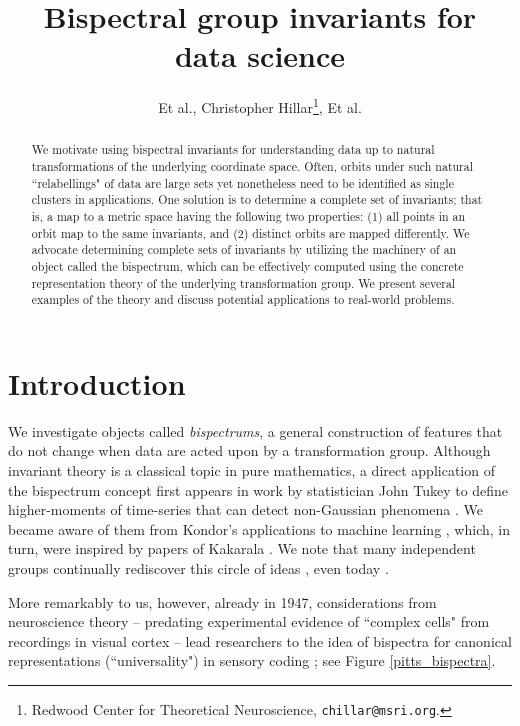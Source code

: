 \documentclass[letterpaper, 10pt]{article}
\theoremstyle{definition}
\begin{document}
\title{Bispectral group invariants for data science}
\author{Et al., Christopher Hillar\thanks{Redwood Center for Theoretical
    Neuroscience, \texttt{chillar@msri.org}.}, Et al. \hspace{20mm}}

\maketitle

\begin{abstract}
We motivate using bispectral invariants for understanding data up to natural transformations of the underlying coordinate space.  Often, orbits under such natural ``relabellings" of data are large sets yet nonetheless need to be identified as single clusters in applications.  One solution is to determine a complete set of invariants; that is, a map to a metric space having the following two properties: (1) all points in an orbit map to the same invariants, and (2) distinct orbits are mapped differently.  We advocate determining complete sets of invariants by utilizing the machinery of an object called the bispectrum, which can be effectively computed using the concrete representation theory of the underlying transformation group.  We present several examples of the theory and discuss potential applications to real-world problems.
\end{abstract}

\section{Introduction}
\label{Sec:Intro}

We investigate objects called \textit{bispectrums}, a general construction of features that do not change when data are acted upon by a transformation group.  Although invariant theory is a classical topic in pure mathematics, a direct application of the bispectrum concept first appears in work by statistician John Tukey to define higher-moments of time-series that can detect non-Gaussian phenomena \cite{tukey1953spectral}.  We became aware of them from Kondor's applications to machine learning \cite{kondor2007complete, kondor2008thesis, kondor2008skew}, which, in turn, were inspired by papers of Kakarala \cite{KakaralaPhD, KakaralaTriple}.  We note that many independent groups continually rediscover this circle of ideas \cite{gourd1989methode}, even today \cite{cohen2018spherical}.

More remarkably to us, however, already in 1947, considerations from neuroscience theory -- predating experimental evidence of ``complex cells" from recordings in visual cortex -- lead researchers to the idea of bispectra for canonical representations (``universality") in sensory coding \cite{pitts1947}; see Figure \ref{pitts_bispectra}.
\end{document}
